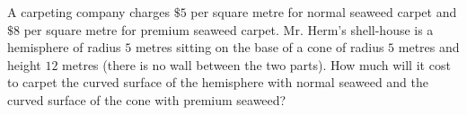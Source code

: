 A carpeting company charges $\$5$ per square metre for normal seaweed carpet and $\$8$ per square metre for premium seaweed carpet. Mr. Herm's shell-house is a hemisphere of radius $5$ metres sitting on the base of a cone of radius $5$ metres and height $12$ metres (there is no wall between the two parts). How much will it cost to carpet the curved surface of the hemisphere with normal seaweed and the curved surface of the cone with premium seaweed?
